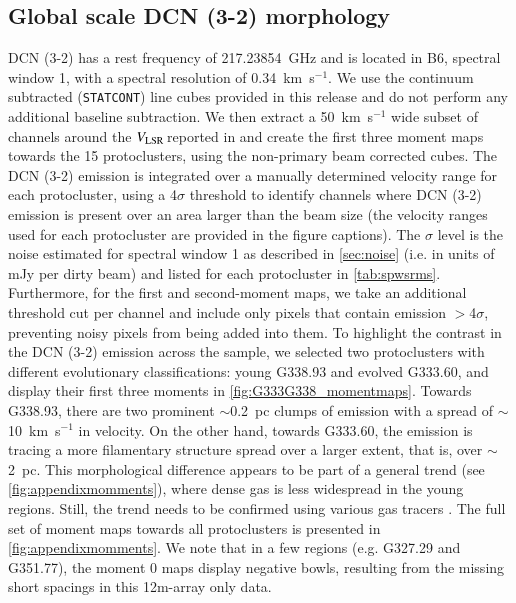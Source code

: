 \documentclass[longauth]{aa} %
\newcommand{\vlsr}{\mbox{$V_{\rm LSR}$\,}}
\newcommand{\kms}{\textrm{km~s}\ensuremath{^{-1}}\xspace}       %
\begin{document}
\subsection{Global scale DCN (3-2) morphology}
\label{sec:momentmaps}

DCN (3-2) has a rest frequency of 217.23854~GHz \citep{muller2001,muller2005} and is located in B6, spectral window 1, with a spectral resolution of 0.34~\kms. We use the continuum subtracted (\texttt{STATCONT}) line cubes provided in this release and do not perform any additional baseline subtraction. We then extract a 50~\kms wide subset of channels around the \vlsr reported in \citet{Motte2022} and create the first three moment maps towards the 15 protoclusters, using the non-primary beam corrected cubes. The DCN (3-2) emission is integrated over a manually determined velocity range for each protocluster, using a 4$\sigma$ threshold to identify channels where DCN (3-2) emission is present over an area larger than the beam size (the velocity ranges used for each protocluster are provided in the figure captions). The $\sigma$ level is the noise estimated for spectral window 1 as described in \cref{sec:noise} (i.e. in units of mJy per dirty beam) and listed for each protocluster in \cref{tab:spwsrms}. Furthermore, for the first and second-moment maps, we take an additional threshold cut per channel and include only pixels that contain emission $>$4$\sigma$, preventing noisy pixels from being added into them. To highlight the contrast in the DCN (3-2) emission across the sample, we selected two protoclusters with different evolutionary classifications: young G338.93 and evolved G333.60, and display their first three moments in \cref{fig:G333G338_momentmaps}. Towards G338.93, there are two prominent $\sim$0.2~pc clumps of emission with a spread of $\sim$10~\kms in velocity. On the other hand, towards G333.60, the emission is tracing a more filamentary structure spread over a larger extent, that is, over $\sim$2~pc. This morphological difference appears to be part of a general trend (see \cref{fig:appendixmomments}), where dense gas is less widespread in the young regions. Still, the trend needs to be confirmed using various gas tracers \citep{Cunningham23}. The full set of moment maps towards all protoclusters is presented in \cref{fig:appendixmomments}. We note that in a few regions (e.g. G327.29 and G351.77), the moment 0 maps display negative bowls, resulting from the missing short spacings in this 12m-array only data.
\end{document}
